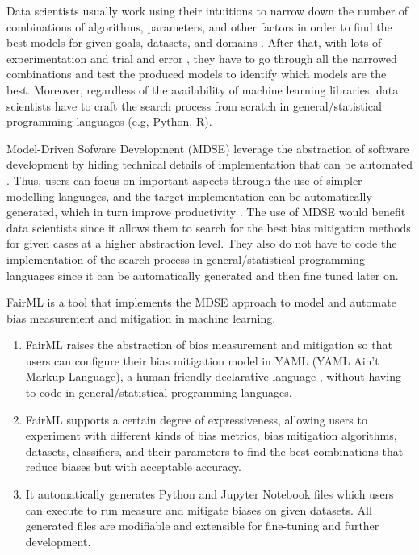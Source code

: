 \documentclass[sigconf,review]{acmart}
\begin{document}
Data scientists usually work using their intuitions to narrow down the number of combinations of algorithms, parameters, and other factors in order to find the best models for given goals, datasets, and domains \cite{muller2016introduction}. After that, with lots of experimentation and trial and error \cite{byrne2017development}, they have to go through all the narrowed combinations and test the produced models to identify which models are the best. Moreover, regardless of the availability of machine learning libraries, data scientists have to craft the search process from scratch in general/statistical programming languages (e.g, Python, R).

Model-Driven Sofware Development (MDSE) leverage the abstraction of software development by hiding technical details of implementation that can be automated \cite{brambilla2017model}. Thus, users can focus on important aspects through the use of simpler modelling languages, and the target implementation can be automatically generated, which in turn improve productivity \cite{volter2013model}. The use of MDSE would benefit data scientists since it allows them to search for the best bias mitigation methods for given cases at a higher abstraction level. They also do not have to code the implementation of the search process in general/statistical programming languages since it can be automatically generated and then fine tuned later on. 

FairML is a tool that implements the MDSE approach to model and automate bias measurement and mitigation in machine learning. 
\begin{enumerate}
	\item FairML raises the abstraction of bias measurement and mitigation so that users can configure their bias mitigation model in YAML (YAML Ain’t Markup Language), a human-friendly declarative language \cite{evans2017yaml}, without having to code in general/statistical programming languages.
	\item FairML supports a certain degree of expressiveness, allowing users to experiment with different kinds of bias metrics, bias mitigation algorithms, datasets, classifiers, and their parameters to find the best combinations that reduce biases but with acceptable accuracy.
	\item It automatically generates Python and Jupyter Notebook files which users can execute to run measure and mitigate biases on given datasets. All generated files are modifiable and extensible for fine-tuning and further development.
\end{enumerate}
\end{document}
